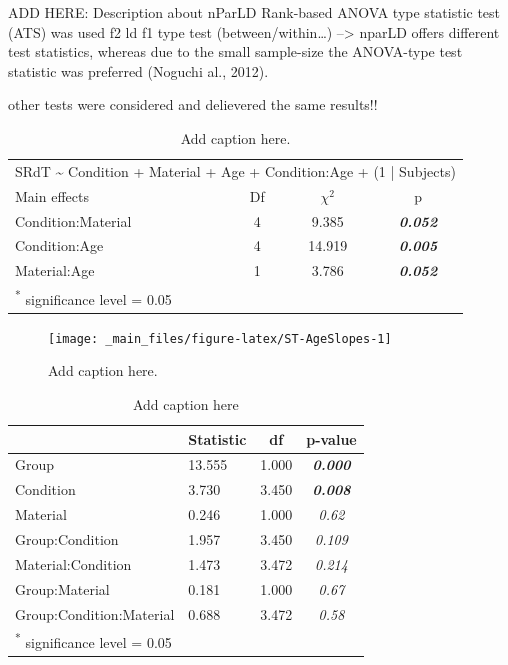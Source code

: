 \documentclass[a4paper, twoside]{templates/ociamthesis}
\begin{document}
ADD HERE: Description about nParLD
Rank-based ANOVA type statistic test (ATS) was used f2 ld f1 type test (between/within\ldots)
--\textgreater{} nparLD offers different test statistics, whereas due to the small sample-size the ANOVA-type test statistic was preferred (Noguchi al., 2012).

other tests were considered and delievered the same results!!

\begin{table}

\caption{\label{tab:ST-AgeLMEM}Add caption here.}
\centering
\begin{tabular}[t]{lcc>{}c}
\toprule
\multicolumn{4}{c}{SRdT \textasciitilde{} Condition + Material + Age + Condition:Age + (1 | Subjects)} \\
\cmidrule(l{3pt}r{3pt}){1-4}
Main effects & Df & $\chi^{2}$ & p\\
\midrule
Condition:Material & 4 & 9.385 & \em{\textbf{0.052}}\\
Condition:Age & 4 & 14.919 & \em{\textbf{0.005}}\\
Material:Age & 1 & 3.786 & \em{\textbf{0.052}}\\
\bottomrule
\multicolumn{4}{l}{\textsuperscript{*} significance level = 0.05}\\
\end{tabular}
\end{table}

\begin{figure}

{\centering \texttt{[image: \_main\_files/figure-latex/ST-AgeSlopes-1]} 

}

\caption{Add caption here.}\label{fig:ST-AgeSlopes}
\end{figure}

\begin{table}

\caption{\label{tab:ST-ANOVAtab}Add caption here}
\centering
\begin{tabular}[t]{llc>{}c}
\toprule
  & Statistic & df & p-value\\
\midrule
Group & 13.555 & 1.000 & \em{\textbf{0.000}}\\
Condition & 3.730 & 3.450 & \em{\textbf{0.008}}\\
Material & 0.246 & 1.000 & \em{0.62}\\
Group:Condition & 1.957 & 3.450 & \em{0.109}\\
Material:Condition & 1.473 & 3.472 & \em{0.214}\\
\addlinespace
Group:Material & 0.181 & 1.000 & \em{0.67}\\
Group:Condition:Material & 0.688 & 3.472 & \em{0.58}\\
\bottomrule
\multicolumn{4}{l}{\textsuperscript{*} significance level = 0.05}\\
\end{tabular}
\end{table}
\end{document}
